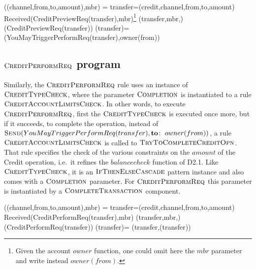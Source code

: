 \begin{asm}
((channel,from,to,amount),mbr)  =\+
  \LET transfer=(credit,channel,from,to,amount)\\
  \IF Received(CreditPreviewReq(transfer),\FROM mbr)\footnote{Given the account $owner$ function, one could omit here the $mbr$ parameter and write instead $owner(from)$.} \THEN \+   
      (transfer,mbr,)\\
      (CreditPreviewReq(transfer)) \dec\-
\WHERE \+
   (transfer)=\+
      (YouMayTriggerPerformReq(transfer),\TO owner(from))
\end{asm}

\subsection{ $\hbox{\sc CreditPerformReq}$ program}
\label{sect:creditperform}


Similarly, the $\hbox{\sc CreditPerformReq}$ rule uses an instance of  $\hbox{\sc CreditTypeCheck}$, where the parameter $\hbox{\sc Completion}$  is instantiated to a rule $\hbox{\sc CreditAccountLimitsCheck}$. In other words, to execute $\hbox{\sc CreditPerformReq}$, first the $\hbox{\sc CreditTypeCheck}$ is executed once more, but if it succeeds, to complete the operation, instead of $\hbox{\sc Send} (YouMayTriggerPerformReq(transfer),\mathrel{\mathbf{to\colon}} owner(from))$, a rule $\hbox{\sc CreditAccountLimitsCheck}$ is called to $\hbox{\sc TryToCompleteCreditOpn}$. That rule specifies the check of the various constraints on the $amount$ of the Credit operation, i.e.\ it refines the $balancecheck$ function of D2.1. Like $\hbox{\sc CreditTypeCheck}$, it is an $\hbox{\sc IfThenElseCascade}$ pattern instance and also comes with a $\hbox{\sc Completion}$ parameter. For $\hbox{\sc CreditPerformReq}$ this parameter is instantiated by a $\hbox{\sc CompleteTransaction}$ component.

\begin{asm}
((channel,from,to,amount),mbr)  =\+
\LET transfer=(credit,channel,from,to,amount)\\
\IF Received(CreditPerformReq(transfer),\FROM mbr) \THEN \+  
  (transfer,mbr,)\\
   (CreditPerformReq(transfer))\dec\-
\WHERE \+
  (transfer)=\+
     (transfer,(transfer))
\end{asm}

